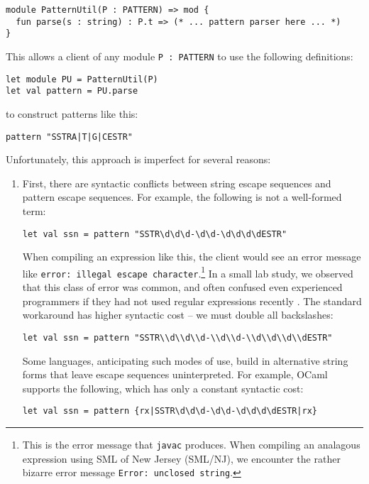 \begin{lstlisting}[numbers=none]
module PatternUtil(P : PATTERN) => mod {
  fun parse(s : string) : P.t => (* ... pattern parser here ... *)
}
\end{lstlisting}
This allows a client of any module \lstinline{P : PATTERN} to use the following definitions:
\begin{lstlisting}[numbers=none]
let module PU = PatternUtil(P)
let val pattern = PU.parse
\end{lstlisting}
to construct patterns like this:
\begin{lstlisting}[numbers=none]
pattern "SSTRA|T|G|CESTR"
\end{lstlisting}
Unfortunately, this approach is imperfect for several reasons:
\begin{enumerate} 
\item First, there are syntactic conflicts between string escape sequences and pattern escape sequences. For example, the following is not a well-formed term:
\begin{lstlisting}[numbers=none,mathescape=|]
let val ssn = pattern "SSTR\d\d\d-\d\d-\d\d\d\dESTR"
\end{lstlisting}
When compiling an expression like this, the client would see an error message like \verb|error: illegal escape character|.\footnote{This is the error message that \texttt{javac} produces. When compiling an analagous expression using SML of New Jersey (SML/NJ), we encounter the rather bizarre error message \texttt{Error: unclosed string}.} In a small lab study, we observed that this class of error was common, and often confused even experienced programmers if they had not used regular expressions recently \cite{Omar:2012:ACC:2337223.2337324}. The standard workaround has higher syntactic cost -- we must double all backslashes:
\begin{lstlisting}[numbers=none]
let val ssn = pattern "SSTR\\d\\d\\d-\\d\\d-\\d\\d\\d\\dESTR"
\end{lstlisting}

Some languages, anticipating such modes of use, build in alternative string forms that leave escape sequences uninterpreted. For example, OCaml supports the following, which has only a constant syntactic cost:
\begin{lstlisting}[numbers=none]
let val ssn = pattern {rx|SSTR\d\d\d-\d\d-\d\d\d\dESTR|rx}
\end{lstlisting}


\end{enumerate}
